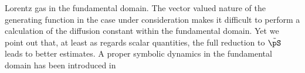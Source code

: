 {Lorentz gas in the fundamental domain.}{ The vector valued nature of
  the generating function  in the case under
  consideration makes it difficult to perform a calculation of the
  diffusion constant within the fundamental domain.  Yet we point out
  that, at least as regards scalar quantities, the full reduction to
  $\tilde{\pS}$ leads to better estimates.  A proper symbolic dynamics
  in the fundamental domain has been introduced in %
  \PublicPrivate{.}{%
    , numerical estimates for scalar quantities are reported in
    \reftab{t-diff-5a}, taken from \refref{CGS}.
  }%
%
}

